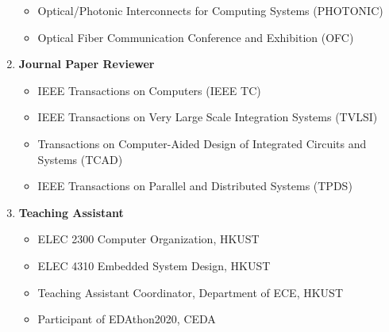 \documentclass{mycv}
\begin{document}
\begin{enumerate}[label={}]
\begin{itemize}
		\item Optical/Photonic Interconnects for Computing Systems (PHOTONIC)
		\item Optical Fiber Communication Conference and Exhibition (OFC)
	\end{itemize}
	\item \textbf{Journal Paper Reviewer}
	\begin{itemize}
		\item IEEE Transactions on Computers (IEEE TC)
		\item IEEE Transactions on Very Large Scale Integration Systems (TVLSI)
		\item Transactions on Computer-Aided Design of Integrated Circuits and Systems (TCAD)
		\item IEEE Transactions on Parallel and Distributed Systems (TPDS)
	\end{itemize}
	\item \textbf{Teaching Assistant}
	\begin{itemize}
		\item ELEC 2300 Computer Organization, HKUST 
		\item ELEC 4310 Embedded System Design, HKUST 
		\item Teaching Assistant Coordinator, Department of ECE, HKUST 
		\item Participant of EDAthon2020, CEDA 
	\end{itemize}
\end{enumerate}
\end{document}
